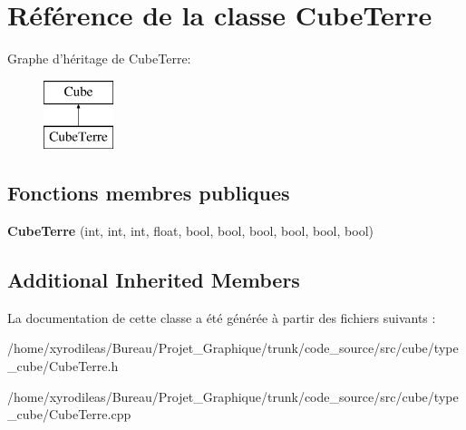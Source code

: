 \hypertarget{classCubeTerre}{\section{Référence de la classe Cube\-Terre}
\label{classCubeTerre}
}
Graphe d'héritage de Cube\-Terre\-:\begin{figure}[H]
\begin{center}
\leavevmode
\includegraphics[height=2.000000cm]{classCubeTerre}
\end{center}
\end{figure}
\subsection*{Fonctions membres publiques}
\begin{DoxyCompactItemize}
\item 
\hypertarget{classCubeTerre_a475c94a1b7537cd9c7ad8328897ab3df}{{\bfseries Cube\-Terre} (int, int, int, float, bool, bool, bool, bool, bool, bool)}\label{classCubeTerre_a475c94a1b7537cd9c7ad8328897ab3df}

\end{DoxyCompactItemize}
\subsection*{Additional Inherited Members}


La documentation de cette classe a été générée à partir des fichiers suivants \-:\begin{DoxyCompactItemize}
\item 
/home/xyrodileas/\-Bureau/\-Projet\-\_\-\-Graphique/trunk/code\-\_\-source/src/cube/type\-\_\-cube/Cube\-Terre.\-h\item 
/home/xyrodileas/\-Bureau/\-Projet\-\_\-\-Graphique/trunk/code\-\_\-source/src/cube/type\-\_\-cube/Cube\-Terre.\-cpp\end{DoxyCompactItemize}
